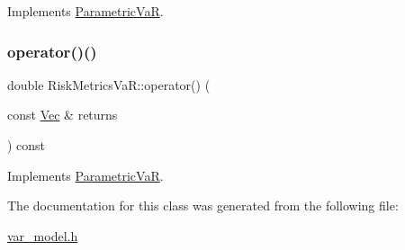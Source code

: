 Implements \hyperlink{classParametricVaR_a5fda9d0e1033ff6e93dd112555ee5e0b}{Parametric\+VaR}.

\hypertarget{classRiskMetricsVaR_a3e79a82675a93c7467451146131a2ec5}{}\label{classRiskMetricsVaR_a3e79a82675a93c7467451146131a2ec5} 
\subsubsection{\texorpdfstring{operator()()}{operator()()}\hspace{0.1cm}{\footnotesize\ttfamily [3/3]}}
{\footnotesize\ttfamily double Risk\+Metrics\+Va\+R\+::operator() (\begin{DoxyParamCaption}\item[{const \hyperlink{compute__returns__eigen_8h_a1eb6a9306ef406d7975f3cbf2e247777}{Vec} \&}]{returns }\end{DoxyParamCaption}) const\hspace{0.3cm}{\ttfamily [virtual]}}



Implements \hyperlink{classParametricVaR_aa07f1d64aff5abf484835cd9105af9c9}{Parametric\+VaR}.



The documentation for this class was generated from the following file\+:\begin{DoxyCompactItemize}
\item 
\hyperlink{var__model_8h}{var\+\_\+model.\+h}\end{DoxyCompactItemize}
